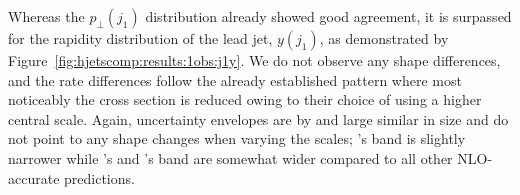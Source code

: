
Whereas the $p_\perp(j_1)$ distribution already showed good agreement, 
it is surpassed for the rapidity distribution of the lead jet, 
$y(j_1)$, as demonstrated by Figure~\ref{fig:hjetscomp:results:1obs:j1y}. 
We do not observe any shape differences, and the rate differences 
follow the already established pattern where most
noticeably the \MGaMC cross section is reduced owing to their choice
of using a higher central scale. Again, uncertainty envelopes are
by and large similar in size and do not point to any shape changes
when varying the scales; \Herwig's band is slightly narrower while
\Sherpa \MEPSatNLO's and \MGaMC's band are somewhat wider compared 
to all other NLO-accurate predictions.

